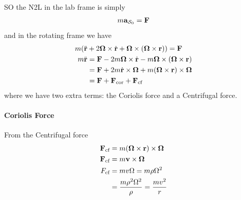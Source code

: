 \documentclass[../main.tex]{subfiles}
\begin{document}
SO the N2L in the lab frame is simply
\begin{align*}
    m \vb a_{\mathcal{S}_0} = \vb F
\end{align*}
and in the rotating frame we have
\begin{align*}
    m(\ddot{\vb r} &+ 2\vb \Omega \times \dot{\vb r} + \vb \Omega \times (\vb \Omega \times \vb r)) = \vb F \\
    m\ddot{\vb r} &= \vb F - 2m\vb \Omega \times \dot{\vb r} - m\vb \Omega \times (\vb \Omega \times \vb r) \\
    &= \vb F + 2m \dot{\vb r} \times \vb \Omega + m(\vb \Omega \times \vb r) \times \vb \Omega \\
    &= \vb F + \vb F_{\text{cor}} + \vb F_{\text{cf}}
\end{align*}
where we have two extra terms: the Coriolis force and a Centrifugal force. 

\paragraph*{Coriolis Force} From the Centrifugal force
\begin{align*}
    \vb F_{\text{cf}} &= m (\vb \Omega \times \vb r) \times \vb \Omega \\
    \vb F_{\text{cf}} &= m \vb v \times \vb \Omega \\
    F_{\text{cf}} &= m v \Omega = m \rho \Omega^2 \\ 
    &= \frac{m \rho^2 \Omega^2}{\rho} = \frac{m v^2}{r}
\end{align*}
\end{document}

